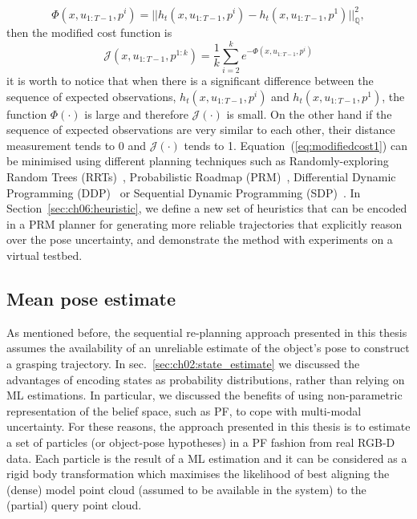 $$
\Phi(x,u_{1:T-1},p^i)=||h_t(x,u_{1:T-1},p^i)-h_t(x,u_{1:T-1},p^1)||_{\mathbb{Q}}^2,
$$
then the modified cost function is
\begin{equation}\label{eq:modifiedcost1}
\mathcal{J}(x,u_{1:T-1},p^{1:k})=\frac{1}{k}\sum_{i=2}^k{e^{-\Phi(x,u_{1:T-1},p^i)}}
\end{equation}
it is worth to notice that when there is a significant difference between the sequence of expected observations, $h_t(x,u_{1:T-1},p^i)$ and $h_t(x,u_{1:T-1},p^1)$, the function $\Phi(\cdot)$ is large and therefore $\mathcal{J}(\cdot)$ is small. On the other hand if the sequence of expected observations are very similar to each other, their distance measurement tends to 0 and $\mathcal{J}(\cdot)$ tends to 1.
Equation~(\ref{eq:modifiedcost1}) can be minimised using different planning techniques such as Randomly-exploring Random Trees (RRTs)~\citep{bib:lavalle_1998}, Probabilistic Roadmap (PRM)~\citep{bib:kavraki_1996}, Differential Dynamic Programming (DDP)~\citep{bib:jacobson_book_1970} or Sequential Dynamic Programming (SDP)~\citep{bib:betts_book_2001}. 
In Section~\ref{sec:ch06:heuristic}, we define a new set of heuristics that can be encoded in a PRM planner for generating more reliable trajectories that explicitly reason over the pose uncertainty, and demonstrate the method with experiments on a virtual testbed.

\subsection{Mean pose estimate}\label{sec:ch06:state_estimator}

As mentioned before, the sequential re-planning approach presented in this thesis assumes the availability of an unreliable estimate of the object's pose to construct a grasping trajectory.
In sec.~\ref{sec:ch02:state_estimate} we discussed the advantages of encoding states as probability distributions, rather than relying on ML estimations. In particular, we discussed the benefits of using non-parametric representation of the belief space, such as PF, to cope with multi-modal uncertainty. For these reasons, the approach presented in this thesis is to estimate a set of particles (or object-pose hypotheses) in a PF fashion from real RGB-D data. Each particle is the result of a ML estimation and it can be considered as a rigid body transformation which maximises the likelihood of best aligning the (dense) model point cloud (assumed to be available in the system) to the (partial) query point cloud. 

